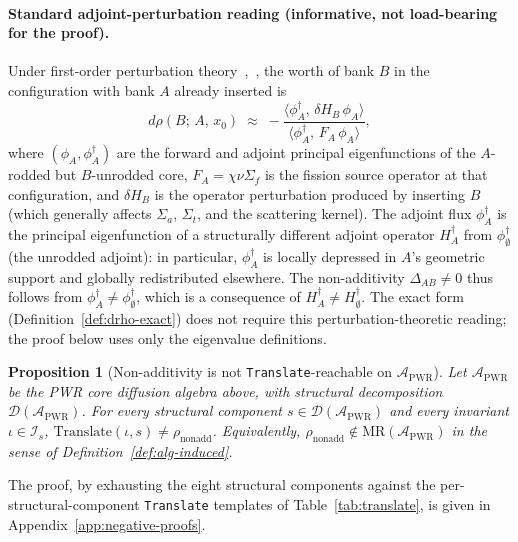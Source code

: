 \documentclass[acmsmall,screen,review]{acmart}
\newtheorem{proposition}{Proposition}
\begin{document}
\paragraph{Standard adjoint-perturbation reading (informative, not load-bearing for the proof).}
Under first-order perturbation theory~\cite[\S6.3]{BellGlasstone1970},~\cite[\S4.4]{LewisMiller1993}, the worth of bank $B$ in the configuration with bank $A$ already inserted is
\[
d\rho(B;\,A,\,x_{0}) \;\approx\; -\frac{\langle \phi^{\dagger}_{A},\, \delta H_{B}\, \phi_{A}\rangle}{\langle \phi^{\dagger}_{A},\, F_{A}\, \phi_{A}\rangle},
\]
where $(\phi_{A}, \phi^{\dagger}_{A})$ are the forward and adjoint principal eigenfunctions of the $A$-rodded but $B$-unrodded core, $F_{A} = \chi \nu \Sigma_{f}$ is the fission source operator at that configuration, and $\delta H_{B}$ is the operator perturbation produced by inserting $B$ (which generally affects $\Sigma_{a}$, $\Sigma_{t}$, and the scattering kernel). The adjoint flux $\phi^{\dagger}_{A}$ is the principal eigenfunction of a structurally different adjoint operator $H^{\dagger}_{A}$ from $\phi^{\dagger}_{\emptyset}$ (the unrodded adjoint): in particular, $\phi^{\dagger}_{A}$ is locally depressed in $A$'s geometric support and globally redistributed elsewhere. The non-additivity $\Delta_{AB} \neq 0$ thus follows from $\phi^{\dagger}_{A} \neq \phi^{\dagger}_{\emptyset}$, which is a consequence of $H^{\dagger}_{A} \neq H^{\dagger}_{\emptyset}$. The exact form (Definition~\ref{def:drho-exact}) does not require this perturbation-theoretic reading; the proof below uses only the eigenvalue definitions.

\begin{proposition}[Non-additivity is not \texttt{Translate}-reachable on $\mathcal{A}_{\mathrm{PWR}}$]
\label{prop:nonadd}
Let $\mathcal{A}_{\mathrm{PWR}}$ be the PWR core diffusion algebra above, with structural decomposition $\mathcal{D}(\mathcal{A}_{\mathrm{PWR}})$. For every structural component $s \in \mathcal{D}(\mathcal{A}_{\mathrm{PWR}})$ and every invariant $\iota \in \mathcal{I}_{s}$, $\mathrm{Translate}(\iota, s) \neq \rho_{\mathrm{nonadd}}$. Equivalently, $\rho_{\mathrm{nonadd}} \notin \mathrm{MR}(\mathcal{A}_{\mathrm{PWR}})$ in the sense of Definition~\ref{def:alg-induced}.
\end{proposition}

The proof, by exhausting the eight structural components against the per-structural-component \texttt{Translate} templates of Table~\ref{tab:translate}, is given in Appendix~\ref{app:negative-proofs}.
\end{document}

